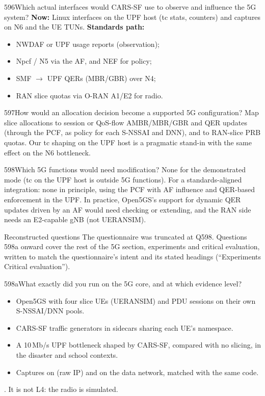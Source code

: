 \begin{qa}{596}{Which actual interfaces would CARS-SF use to observe and influence the 5G system?}
\textbf{Now:} Linux interfaces on the UPF host (tc stats, counters) and captures on N6 and the UE TUNs.
\textbf{Standards path:}
\begin{itemize}
\item NWDAF or UPF usage reports (observation);
\item Npcf / N5 via the AF, and NEF for policy;
\item SMF $\rightarrow$ UPF QERs (MBR/GBR) over N4;
\item RAN slice quotas via O-RAN A1/E2 for radio.
\end{itemize}
\end{qa}

\begin{qa}{597}{How would an allocation decision become a supported 5G configuration?}
Map slice allocations to session or QoS-flow AMBR/MBR/GBR and QER updates (through the PCF, as policy for each S-NSSAI
and DNN), and to RAN-slice PRB quotas. Our tc shaping on the UPF host is a pragmatic stand-in with the same effect
on the N6 bottleneck.
\end{qa}

\begin{qa}{598}{Which 5G functions would need modification?}
None for the demonstrated mode (tc on the UPF host is outside 5G functions). For a standards-aligned integration: none
in principle, using the PCF with AF influence and QER-based enforcement in the UPF. In practice, Open5GS's support for
dynamic QER updates driven by an AF would need checking or extending, and the RAN side needs an E2-capable gNB (not
UERANSIM).
\end{qa}

\begin{warnbox}{Reconstructed questions}
The questionnaire was truncated at Q598. Questions 598a onward cover the rest of the 5G section, experiments and
critical evaluation, written to match the questionnaire's intent and its stated headings (``Experiments \textperiodcentered{}
Critical evaluation'').
\end{warnbox}

\begin{qa}{598a}{What exactly did you run on the 5G core, and at which evidence level?}
\begin{itemize}
\item Open5GS with four slice UEs (UERANSIM) and PDU sessions on their own S-NSSAI/DNN pools.
\item CARS-SF traffic generators in sidecars sharing each UE's namespace.
\item A 10\,Mb/s UPF bottleneck shaped by CARS-SF, compared with no slicing, in the disaster and school contexts.
\item Captures on  (raw IP) and on the data network, matched with the same code.
\end{itemize}
\Lthreefg. It is not L4: the radio is simulated.
\end{qa}

